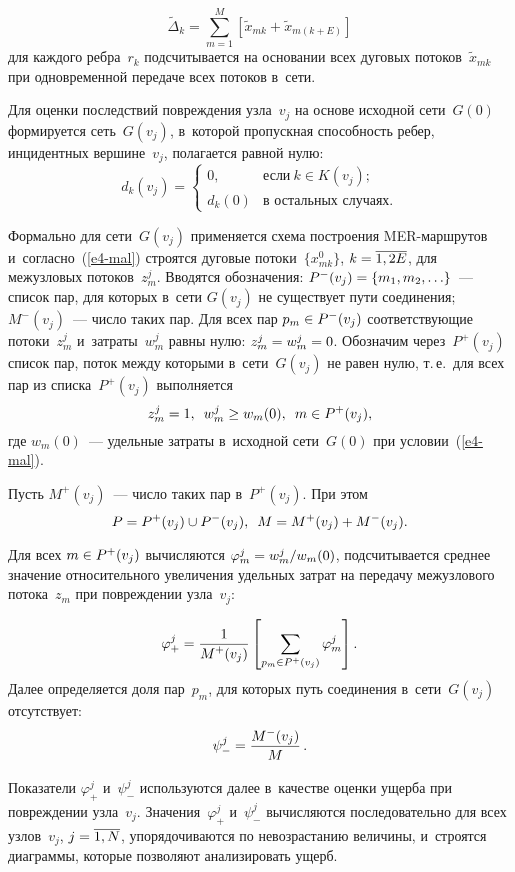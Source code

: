 \begin{multicols}{2}
\noindent
$$
\tilde{\Delta}_k = \sum\limits_{m = 1}^M \left[\tilde{x}_{mk} + \tilde{x}_{m(k+E)}\right]  
$$
для каждого ребра~$r_k$ подсчитывается на основании всех дуговых потоков~$\tilde{x}_{mk}$ при одновременной передаче всех потоков в~сети.

Для оценки последствий по\-вреж\-де\-ния узла~$v_j$ на основе исходной сети~$G(0)$ 
формируется сеть~$G(v_j)$, в~которой пропускная способность ребер, инцидентных 
вершине~$v_j$, полагается равной нулю:
$$ 
d_k(v_j) = \begin{cases}
 0, & \mbox{если} \ k \in K(v_j); \\
 d_k(0) & \mbox{в\ остальных\ случаях.}
\end{cases} 
$$

Формально для сети~$G(v_j)$ применяется схема построения MER-марш\-ру\-тов и~со\-глас\-но~(\ref{e4-mal}) 
строятся дуговые потоки~$\{x_{mk}^0\}$, $k \hm= \overline{1, 2E}$, для 
межузловых потоков~$z_m^j$.
Вводятся  обозначения: $P^-(v_j) \hm= \{m_1, m_2, \ldots \}$~--- список пар, для 
которых в~сети $G(v_j)$ не существует пути соединения; $M^-(v_j)$~--- число 
таких пар. Для всех пар $p_m \hm\in P^-(v_j)$ соответствующие потоки~$z_m^j$ и~затраты~$w_m^j$ равны нулю:
 $z_m^j \hm= w_m^j \hm= 0$.
Обозначим через~$P^+(v_j)$ список пар, поток между которыми в~сети~$G(v_j)$ не 
равен нулю, т.\,е.\ для всех пар из списка~$P^+(v_j)$ выполняется
$$ 
z_m^j =1, \enskip w_m^j \ge w_m(0), \enskip m \in P^+(v_j), 
$$
где $w_m(0)$~--- удельные затраты в~исходной сети~$G(0)$ при  условии~(\ref{e4-mal}).

Пусть $M^+(v_j)$~--- число таких пар в~$P^+(v_j)$. При этом
$$ 
P = P^+(v_j) \cup P^-(v_j), \enskip M = M^+(v_j) + M^-(v_j).
$$


Для всех $m \hm\in P^+(v_j)$ вычисляются $\varphi_m^j\hm = w_m^j/w_m(0)$, 
подсчитывается среднее значение относительного увеличения удельных затрат на 
передачу межузлового потока~$z_m$ при по\-вреж\-де\-нии узла~$v_j$:

\noindent
$$
 \varphi_+^j = \displaystyle\frac{\displaystyle 1\mathstrut}{\displaystyle M^+(v_j)\mathstrut} \left[ \sum\limits_{p_m \in P^+(v_j)} \varphi_m^j 
\right].
$$
Далее определяется доля пар~$p_m$, для которых путь соединения в~сети~$G(v_j)$ 
отсутствует:
$$  
\psi_-^j = \displaystyle\frac{\displaystyle M^-(v_j)\mathstrut}{\displaystyle M\mathstrut}\,.
$$

Показатели $\varphi_+^j$ и~$\psi_-^j$ используются далее в~качестве оценки 
ущерба при по\-вреж\-де\-нии узла~$v_j$. Значения~$\varphi_+^j$ и~$\psi_-^j$ 
вычисляются последовательно для всех узлов~$v_j$, $j \hm= \overline{1, N}$, 
упорядочиваются по невозрастанию величины, и~строятся диаграммы, которые 
позволяют анализировать ущерб.


\end{multicols}
